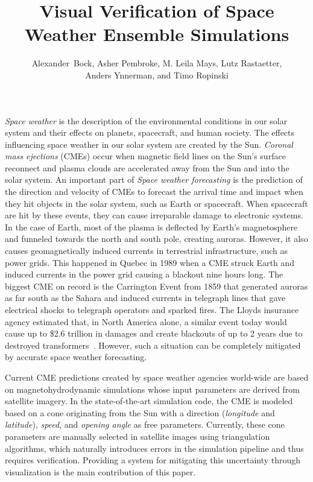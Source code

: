 \documentclass[journal]{vgtc}                %
\title{Visual Verification of Space Weather Ensemble Simulations}
\author{
    Alexander~Bock,
    Asher Pembroke,
    M. Leila Mays,
    Lutz Rastaetter,\\%
    Anders Ynnerman,
    and Timo Ropinski%
}
\begin{document}
\maketitle
\emph{Space weather} is the description of the environmental conditions in our solar system and their effects on planets, spacecraft, and human society. The effects influencing space weather in our solar system are created by the Sun. \emph{Coronal mass ejections} (CMEs) occur when magnetic field lines on the Sun's surface reconnect and plasma clouds are accelerated away from the Sun and into the solar system. An important part of \emph{Space weather forecasting} is the prediction of the direction and velocity of CMEs to forecast the arrival time and impact when they hit objects in the solar system, such as Earth or spacecraft. When spacecraft are hit by these events, they can cause irreparable damage to electronic systems. In the case of Earth, most of the plasma is deflected by Earth's magnetosphere and funneled towards the north and south pole, creating auroras. However, it also causes geomagnetically induced currents in terrestrial infrastructure, such as power grids. This happened in Quebec in 1989 when a CME struck Earth and induced currents in the power grid causing a blackout nine hours long. The biggest CME on record is the Carrington Event from 1859 that generated auroras as far south as the Sahara and induced currents in telegraph lines that gave electrical shocks to telegraph operators and sparked fires. The Lloyds insurance agency estimated that, in North America alone, a similar event today would cause up to \$2.6 trillion in damages and create blackouts of up to 2 years due to destroyed transformers~\cite{lloyds2013impact}. However, such a situation can be completely mitigated by accurate space weather forecasting.

Current CME predictions created by space weather agencies world-wide are based on magnetohydrodynamic simulations whose input parameters are derived from satellite imagery. In the state-of-the-art simulation code, the CME is modeled based on a cone originating from the Sun with a direction (\emph{longitude} and \emph{latitude}), \emph{speed}, and \emph{opening angle} as free parameters. Currently, these cone parameters are manually selected in satellite images using triangulation algorithms, which naturally introduces errors in the simulation pipeline and thus requires verification. Providing a system for mitigating this uncertainty through visualization is the main contribution of this paper.
\end{document}
